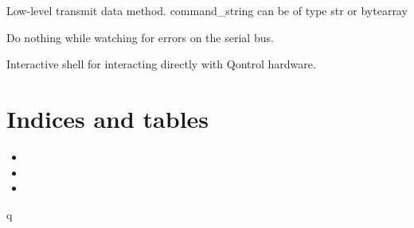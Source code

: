 \documentclass[letterpaper,10pt,english]{sphinxmanual}
\begin{document}
\begin{fulllineitems}
\begin{fulllineitems}
\end{fulllineitems}


\begin{fulllineitems}
\label{\detokenize{qontrol:qontrol.Qontroller.transmit}}
Low-level transmit data method. command\_string can be of type str or bytearray

\end{fulllineitems}


\begin{fulllineitems}
\label{\detokenize{qontrol:qontrol.Qontroller.wait}}
Do nothing while watching for errors on the serial bus.

\end{fulllineitems}


\end{fulllineitems}


\begin{fulllineitems}
\label{\detokenize{qontrol:qontrol.run_interactive_shell}}
Interactive shell for interacting directly with Qontrol hardware.

\end{fulllineitems}



\chapter{Indices and tables}
\label{\detokenize{index:indices-and-tables}}\begin{itemize}
\item {} 

\item {} 

\item {} 

\end{itemize}


\renewcommand{\indexname}{Python Module Index}
\begin{sphinxtheindex}
\def\bigletter#1{{\Large\sffamily#1}\nopagebreak\vspace{1mm}}
\bigletter{q}
\item {}
\end{sphinxtheindex}

\renewcommand{\indexname}{Index}
\printindex
\end{document}
